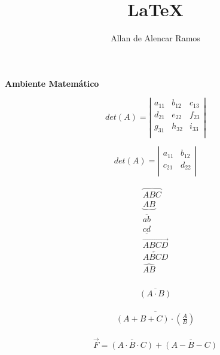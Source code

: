 \documentclass[12pt, a4paper]{article}
\begin{document}
\title{LaTeX}
\author{Allan de Alencar Ramos}
\maketitle

\begin{center}
\large\textbf{Ambiente Matemático}
\end{center}
\vspace{0.5cm}

\begin{equation}
det(A) = 
\left\vert
\begin{array}{lcr}
	a_{11} & b_{12} & c_{13} \\
	d_{21} & e_{22} & f_{23} \\
	g_{31} & h_{32} & i_{33} \\
\end{array}
\right\vert
\end{equation}

\begin{equation}
det(A) = 
\left\vert
\begin{array}{lr}
	a_{11} & b_{12} \\
	c_{21} & d_{22} \\
\end{array}
\right\vert
\end{equation}

\begin{eqnarray}
\overbrace{ABC}\\
\underbrace{AB}\\
\overline{ab}\\
\underline{cd}\\
\overrightarrow{ABCD}\\
\overleftarrow{ABCD}\\
\widehat{AB}\\
\end{eqnarray}

\begin{eqnarray}
	\overline{(A \cdot B)}
\end{eqnarray}

\begin{eqnarray}
\overline{ (A + B + C) \cdot \left(\frac{A}{B}\right) }
\end{eqnarray}

\begin{eqnarray}
\vec{F} = 
\overline{(A \cdot B \cdot C)} + \overline{(A - B - C)}
\end{eqnarray}
\end{document}
